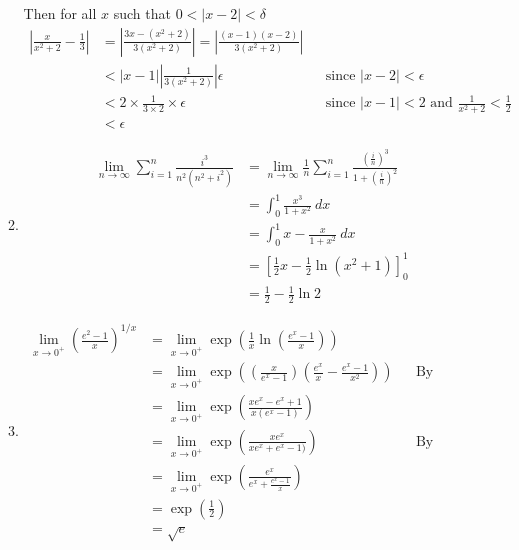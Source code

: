 \documentclass[12pt]{article}
\theoremstyle{definition}
\begin{document}
\begin{enumerate}
\begin{enumerate}[label=(\alph*)]
                Then for all $x$ such that $0<|x-2|<\delta$
                \begin{align*}
                  \left|\frac{x}{x^2+2}-\frac{1}{3}\right| &= \left|\frac{3x-(x^2+2)}{3(x^2+2)}\right|=\left|\frac{(x-1)(x-2)}{3(x^2+2)}\right| \\
                    &< |x-1|\left|\frac{1}{3(x^2+2)}\right|\epsilon && \text{since }|x-2|<\epsilon\\
                    &< 2\times\frac{1}{3\times 2}\times\epsilon && \text{since }|x-1|<2\text{ and }\frac{1}{x^2+2}<\frac{1}{2}\\
                    &< \epsilon
                \end{align*}
          \item \begin{align*}
                  \lim_{n\to \infty} \sum_{i=1}^n \frac{i^3}{n^2(n^2+i^2)} &= \lim_{n\to \infty} \frac{1}{n} \sum_{i=1}^n \frac{(\frac{i}{n})^3}{1+(\frac{i}{n})^2} \\
                    &= \int_0^1 \frac{x^3}{1+x^2}\ dx \\
                    &= \int_0^1 x-\frac{x}{1+x^2}\ dx \\
                    &= \left[\frac{1}{2}x-\frac{1}{2}\ln(x^2+1)\right]_0^1 \\
                    &= \frac{1}{2}-\frac{1}{2}\ln 2
                \end{align*}
          \item \begin{align*}
                  \lim_{x\to 0^+}\left(\frac{e^2-1}{x}\right)^{1/x} &= \lim_{x\to 0^+} \exp\left(\frac{1}{x}\ln\left(\frac{e^x-1}{x}\right) \right) \\
                    &= \lim_{x\to 0^+} \exp\left(\left(\frac{x}{e^x-1}\right)\left(\frac{e^x}{x}-\frac{e^x-1}{x^2} \right) \right) && \text{By L'Hôpital's rule} \\
                    &= \lim_{x\to 0^+} \exp\left(\frac{xe^x-e^x+1}{x(e^x-1)} \right) \\
                    &= \lim_{x\to 0^+} \exp\left(\frac{xe^x}{xe^x+e^x-1)} \right) && \text{By L'Hôpital's rule} \\
                    &= \lim_{x\to 0^+} \exp\left(\frac{e^x}{e^x+\frac{e^x-1}{x}}\right) \\
                    &= \exp\left(\frac{1}{2}\right) \\
                    &= \sqrt{e}
                \end{align*}
        \end{enumerate}

\end{enumerate}
\end{document}
